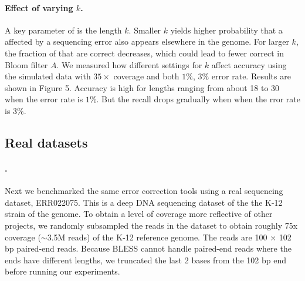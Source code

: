 \documentclass{bmcart}
\begin{document}



\paragraph{Effect of varying $k$.}  
A key parameter of \tool is the \kmer length $k$.  Smaller $k$ yields higher probability that a \kmer affected by a sequencing error also appears elsewhere in the genome.  For larger $k$, the fraction of \kmers that are correct decreases, which could lead to fewer correct \kmer in Bloom filter $A$.  We measured how different settings for $k$ affect accuracy using the simulated data with $35\times$ coverage and both $1\%$, $3\%$ error rate.  Results are shown in Figure 5.  Accuracy is high for \kmer lengths ranging from about 18 to 30 when the error rate is $1\%$. But the recall drops gradually when when the rror rate is $3\%$. 






\subsection*{Real datasets}
\paragraph{\ecolinoemph.}  Next we benchmarked the same error correction tools using a real sequencing dataset, ERR022075.
This is a deep DNA sequencing dataset of the the K-12 strain of the \ecoli genome.
To obtain a level of coverage more reflective of other projects, we randomly subsampled the reads in the dataset to obtain roughly 75x coverage ($\sim$3.5M reads) of the \ecoli K-12 reference genome.
The reads are 100 $\times$ 102 bp paired-end reads.
Because BLESS cannot handle paired-end reads where the ends have different lengths, we truncated the last 2 bases from the 102 bp end before running our experiments.
\end{document}
